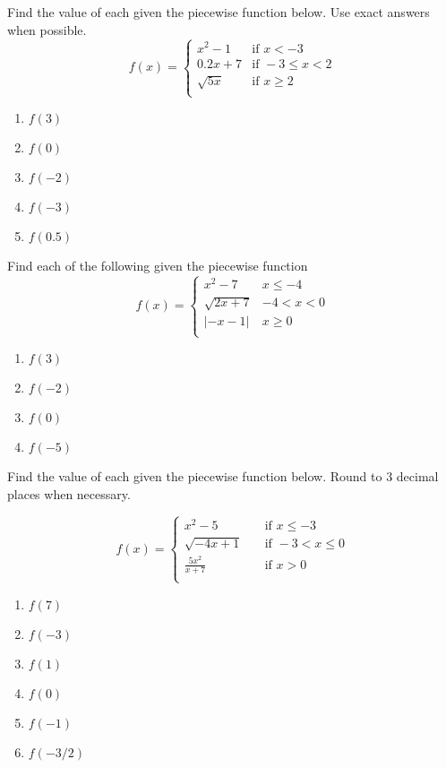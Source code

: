 Find the value of each given the piecewise function below. Use exact answers when possible.
\[
f(x) = \begin{cases}
    x^2-1   &\text{if } x < -3 \\
    0.2x+7  &\text{if } -3 \leq x < 2   \\
    \sqrt{5x}   &\text{if } x \geq 2    \\
\end{cases}
\]
\begin{enumerate}
\item $f(3)$
\item $f(0)$
\item $f(-2)$
\item $f(-3)$
\item $f(0.5)$
\setcounter{Review}{\value{enumi}}
\end{enumerate}

Find each of the following given the piecewise function
\[f(x) = 
\begin{cases}
x^2-7 & x \leq -4 \\
\sqrt{2x+7} & -4 < x < 0 \\
|-x-1| & x \geq 0 \\
\end{cases}
\]
\begin{enumerate}	\setcounter{enumi}{\value{Review}}
\item $f(3)$
\item $f(-2)$
\item $f(0)$
\item $f(-5)$
\setcounter{Review}{\value{enumi}}
\end{enumerate}

Find the value of each given the piecewise function below. Round to 3 decimal places when necessary.

\[
 f(x) = 
 \begin{cases}
    x^2 - 5 \quad &\text{if } x \leq -3 \\[6pt]
    
    \sqrt{-4x + 1} \quad &\text{if } -3 < x \leq 0 \\[6pt]
    
    \frac{5x^2}{x+7} \quad &\text{if } x > 0 \\
 \end{cases}
\]

\begin{enumerate}	\setcounter{enumi}{\value{Review}}
\item $f(7)$
\item $f(-3)$
\item $f(1)$
\item $f(0)$
\item $f(-1)$
\item $f(-3/2)$
\end{enumerate}

